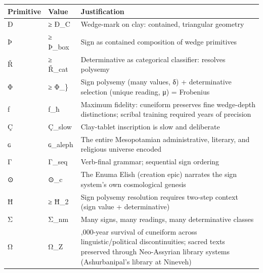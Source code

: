 {\def\LTcaptype{none} %
\begin{longtable}[]{@{}
  >{\raggedright\arraybackslash}p{}
  >{\raggedright\arraybackslash}p{}
  >{\raggedright\arraybackslash}p{}@{}}
\toprule\noalign{}
\begin{minipage}[b]{\linewidth}\raggedright
Primitive
\end{minipage} & \begin{minipage}[b]{\linewidth}\raggedright
Value
\end{minipage} & \begin{minipage}[b]{\linewidth}\raggedright
Justification
\end{minipage} \\
\midrule\noalign{}
\endhead
\bottomrule\noalign{}
\endlastfoot
Ð & ≥ Ð\_C & Wedge-mark on clay: contained, triangular geometry \\
Þ & ≥ Þ\_box & Sign as contained composition of wedge primitives \\
Ř & ≥ Ř\_cat & Determinative as categorical classifier: resolves
polysemy \\
Φ & ≥ Φ\_\} & Sign polysemy (many values, δ) + determinative selection
(unique reading, μ) = Frobenius \\
ƒ & ƒ\_ħ & Maximum fidelity: cuneiform preserves fine wedge-depth
distinctions; scribal training required years of precision \\
Ç & Ç\_slow & Clay-tablet inscription is slow and deliberate \\
ɢ & ɢ\_aleph & The entire Mesopotamian administrative, literary, and
religious universe encoded \\
Γ & Γ\_seq & Verb-final grammar; sequential sign ordering \\
⊙ & ⊙\_c & The Enuma Elish (creation epic) narrates the sign system's
own cosmological genesis \\
Ħ & ≥ Ħ\_2 & Sign polysemy resolution requires two-step context (sign
value + determinative) \\
Σ & Σ\_nm & Many signs, many readings, many determinative classes \\
Ω & Ω\_Z & 3,000-year survival of cuneiform across linguistic/political
discontinuities; sacred texts preserved through Neo-Assyrian library
systems (Ashurbanipal's library at Nineveh) \\
\end{longtable}
}

